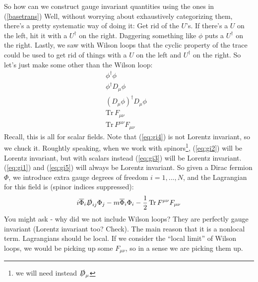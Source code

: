 \documentclass[main.tex]{subfiles}
\begin{document}
So how can we construct gauge invariant quantities using the ones in (\ref{basetrans}) Well, without worrying about exhaustively categorizing them, there's a pretty systematic way of doing it: Get rid of the $U$'s. If there's a $U$ on the left, hit it with a $U^\dagger$ on the right. Daggering something like $\phi$ puts a $U^\dagger$ on the right. Lastly, we saw with Wilson loops that the cyclic property of the trace could be used to get rid of things with a $U$ on the left and $U^\dagger$ on the right. So let's just make some other than the Wilson loop:
\begin{subequations} \label{eq:gaugeinv}
\begin{align}
\phi^\dagger \phi & \label{eq:gi1} \\
\phi^\dagger D_\mu \phi & \label{eq:gi2}\\
(D_\mu \phi)^\dagger D_\mu \phi & \label{eq:gi3} \\
\text{Tr} \, F_{\mu \nu} & \label{eq:gi4}\\
\text{Tr} \, F^{\mu \nu} F_{\mu \nu} & \label{eq:gi5}
\end{align}
\end{subequations}
Recall, this is all for scalar fields. Note that (\ref{eq:gi4}) is not Lorentz invariant, so we chuck it. Roughtly speaking, when we work with spinors\footnote{we will need instead $\slashed{D}_\mu$}, (\ref{eq:gi2}) will be Lorentz invariant, but with scalars instead (\ref{eq:gi3}) will be Lorentz invariant.  (\ref{eq:gi1}) and (\ref{eq:gi5}) will always be Lorentz invariant. So given a Dirac fermion $\Phi$, we introduce extra gauge degrees of freedom $i=1,...,N$, and the Lagrangian for this field is (spinor indices suppressed):
\label{eq:nicelag}
\begin{equation}
i \overline{\Phi}_{i} \slashed{D}_{ij} \Phi_j - m \overline{\Phi}_i \Phi_i -\frac{1}{2} \, \text{Tr} \, F^{\mu \nu} F_{\mu \nu}
\end{equation}
You might ask - why did we not include Wilson loops? They are perfectly gauge invariant (Lorentz invariant too? Check). The main reason that it is a nonlocal term.\cite{PSE1} Lagrangians should be local. If we consider the ``local limit'' of Wilson loops, we would be picking up some $F_{\mu \nu}$, so in a sense we are picking them up.
\end{document}
